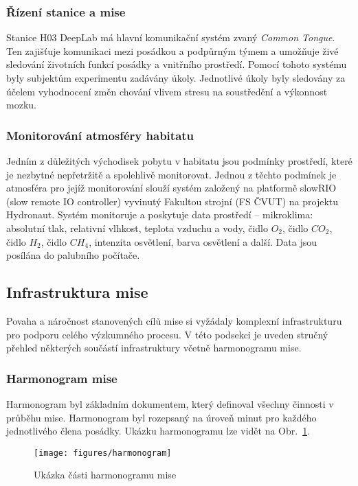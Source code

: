 \subsubsection{Řízení stanice a mise}
\label{subsubsec:rizeni_stanice_mise}
Stanice H03 DeepLab má hlavní komunikační systém zvaný \textit{Common Tongue}.
Ten zajišťuje komunikaci mezi posádkou a podpůrným týmem a umožňuje živé
sledování životních funkcí posádky a vnitřního prostředí. Pomocí tohoto systému
byly subjektům experimentu zadávány úkoly. Jednotlivé úkoly byly sledovány za
účelem vyhodnocení změn chování vlivem stresu na soustředění a výkonnost mozku.

\subsubsection{Monitorování atmosféry habitatu}
Jedním z důležitých východisek pobytu v habitatu jsou podmínky prostředí, které
je nezbytné nepřetržitě a spolehlivě monitorovat. Jednou z těchto podmínek je
atmosféra pro jejíž monitorování slouží systém založený na platformě slowRIO
(slow remote IO controller) vyvinutý Fakultou strojní (FS ČVUT) na projektu
Hydronaut. Systém monitoruje a poskytuje data prostředí -- mikroklima: absolutní
tlak, relativní vlhkost, teplota vzduchu a vody, čidlo $O_2$, čidlo $CO_2$,
čidlo $H_2$, čidlo $CH_4$, intenzita osvětlení, barva osvětlení a další. Data
jsou posílána do palubního počítače.

\subsection{Infrastruktura mise}
\label{subsec:infrastruktura_mise}
Povaha a náročnost stanovených cílů mise si vyžádaly komplexní infrastrukturu
pro podporu celého výzkumného procesu. V této podsekci je uveden stručný přehled
některých součástí infrastruktury včetně harmonogramu mise.

\subsubsection{Harmonogram mise}
\label{subsubsec:harmonogram_mise}
Harmonogram byl základním dokumentem, který definoval všechny činnosti v průběhu
mise. Harmonogram byl rozepsaný na úroveň minut pro každého jednotlivého člena
posádky. Ukázku harmonogramu lze vidět na Obr.~\ref{fig:harmonogram}.

\begin{figure}[h]
    \begin{center}
        \begin{framed}
            \texttt{[image: figures/harmonogram]}
        \end{framed}
        \caption{Ukázka části harmonogramu mise}
        \label{fig:harmonogram}
    \end{center}
\end{figure}

